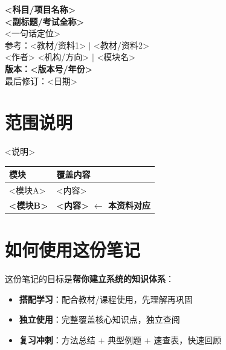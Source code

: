 \documentclass[10pt,a4paper]{article}
\begin{document}
\begin{center}
  \vspace{2em}
  {\Huge\bfseries\color{titlecolor} <科目/项目名称>} \\[0.3em]
  {\LARGE\bfseries\color{titlecolor} <副标题/考试全称>} \\[0.3em]
  {\large\color{gray!70!black} <一句话定位>} \\[0.3em]
  \vspace{0.3em}
  {\small\color{gray} 参考：<教材/资料1> \;$\vert$\; <教材/资料2>} \\[0.3em]
  {\small\color{gray} <作者> \quad <机构/方向> \;$\vert$\; <模块名>} \\[0.6em]
  {\normalsize\color{titlecolor!80!black}\textbf{版本：<版本号/年份>}} \\[0.1em]
  {\footnotesize\color{gray} 最后修订：<日期>}
  \vspace{1em}
\end{center}

\section*{范围说明}
\noindent <说明>

\begin{center}
{\footnotesize
\begin{tabular}{@{}ll@{}}
\toprule
\textbf{模块} & \textbf{覆盖内容} \\
\midrule
<模块A> & <内容> \\
\textbf{<模块B>} & \textbf{<内容> $\leftarrow$ 本资料对应} \\
\bottomrule
\end{tabular}
}
\end{center}

\section*{如何使用这份笔记}
\noindent 这份笔记的目标是\textbf{帮你建立系统的知识体系}：
\begin{itemize}
  \item \textbf{搭配学习}：配合教材/课程使用，先理解再巩固
  \item \textbf{独立使用}：完整覆盖核心知识点，独立查阅
  \item \textbf{复习冲刺}：方法总结 + 典型例题 + 速查表，快速回顾
\end{itemize}
\end{document}
